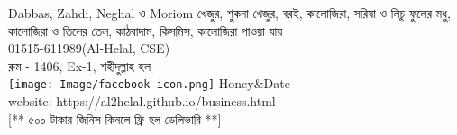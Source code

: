 \documentclass[a4paper,12pt]{article}
\begin{document}
\centering
{}
{
\begin{minipage}{0.43\textwidth}
 Dabbas, Zahdi, Neghal  ও Moriom খেজুর, শুকনা খেজুর, বরই, কালোজিরা, সরিষা ও  লিচু ফুলের মধু, কালোজিরা ও তিলের তেল, কাঠবাদাম, কিসমিস, কালোজিরা পাওয়া যায়\\01515-611989(Al-Helal, CSE)\\
রুম - 1406, Ex-1, শহীদুল্লাহ হল\\
\texttt{[image: Image/facebook-icon.png]} Honey\&Date\\ website: https://al2helal.github.io/business.html\\ [** ৫০০ টাকার জিনিস কিনলে ফ্রি হল ডেলিভারি **]
\end{minipage}\vspace{0.5cm}
}
\end{document}
